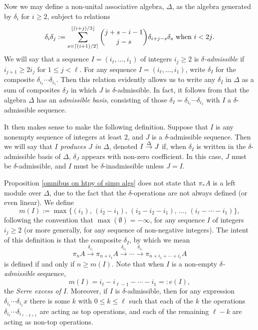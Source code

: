 \documentclass[11pt]{amsart}
\theoremstyle{plain}
\theoremstyle{definition}
\renewcommand{\to}{\longrightarrow}
\theoremstyle{plain}
\newcommand{\deltaalg}{\Delta} %
\newcommand{\minDimDelta}{m}
\newcommand{\produces}[3]{#3:#1\sim #2}
\renewcommand{\produces}[3]{#1\rightarrow_{#3} #2}%
\renewcommand{\produces}[3]{#1\overset{\smash{#3}}{\rightarrow} #2}%
\begin{document}
\begin{Constructing (co)homotopy operations}
Now we may define a non-unital associative algebra, $\deltaalg$, as the algebra generated by $\delta_i$ for $i\geq2$, subject to relations
\[\delta_i\delta_j:=\sum_{s=\lceil(i+1)/2\rceil}^{\lfloor(i+j)/3\rfloor}{j+s-i-1\choose j-s}\delta_{i+j-s}\delta_s\textup{ when $i<2j$}.\]
We will say that a sequence $I=(i_\ell,\ldots,i_1)$ of integers $i_j\geq2$ is \emph{$\delta$-admissible} if $i_{j+1}\geq 2i_j$ for $1\leq j <\ell$. For any sequence $I=(i_\ell,\ldots,i_1)$, write $\delta_I$ for the composite $\delta_{i_\ell}\cdots \delta_{i_1}$. Then this relation evidently allows us to write any $\delta_I$ in $\deltaalg$ as a sum of composites $\delta_J$ in which $J$ is $\delta$-admissible. In fact, it follows from \cite[Proposition 2.7]{MR1089001} that the algebra $\deltaalg$ has an \emph{admissible basis}, consisting of those $\delta_I=\delta_{i_\ell}\cdots \delta_{i_{1}}$ with $I$ a $\delta$-admissible sequence. 

It then makes sense to make the following definition. Suppose that $I$ is any nonempty sequence of integers at least $2$, and $J$ is a $\delta$-admissible sequence. Then we will say that \emph{$I$ produces $J$ in $\deltaalg$}, denoted $\produces{I}{J}{\deltaalg}$ if, when $\delta_I$ is written in the $\delta$-admissible basis of $\deltaalg$, $\delta_J$ appears with non-zero coefficient. In this case, $J$ must be $\delta$-admissible, and $I$ must be $\delta$-inadmissible unless $J=I$.

Proposition \ref{omnibus on htpy of simp algs} does not state that $\pi_*A$ is a left module over $\deltaalg$, due to the fact that the $\delta$-operations are not always defined (or even linear). We define
\[\minDimDelta(I):=\max\{(i_1),\,(i_2-i_1),\,(i_3-i_2-i_1),\,\ldots,\,(i_{\ell}-\cdots-i_1)\},
\]
following the convention that $\max(\emptyset)=-\infty$, for any sequence $I$ of integers $i_j\geq2$ (or more generally, for any sequence of non-negative integers).  The intent of this definition is that the composite $\delta_I$, by which we mean
\[\pi_{n}A\overset{\delta_{i_1}}{\to}\pi_{n+i_1}A\overset{\delta_{i_2}}{\to}\cdots \overset{\delta_{i_\ell}}{\to}\pi_{n+i_1+\cdots +i_\ell}A\]
is defined if and only if $n\geq \minDimDelta(I)$. 
Note that when $I$ is a non-empty \emph{$\delta$-admissible} sequence,
\[\minDimDelta(I)=i_{\ell}-i_{\ell-1}-\cdots -i_1=:e(I),\]
the \emph{Serre excess of $I$}. Moreover, if $I$ is $\delta$-admissible, then for any expression $\delta_{i_{\ell}}\cdots \delta_{i_{1}}x$ there is some $k$ with $0\leq k\leq \ell$ such that each of the $k$ the operations $\delta_{i_{\ell}}\cdots \delta_{i_{\ell-k+1}}$ are acting as top operations, and each of the remaining $\ell-k$ are acting as non-top operations.


\end{Constructing (co)homotopy operations}
\end{document}
